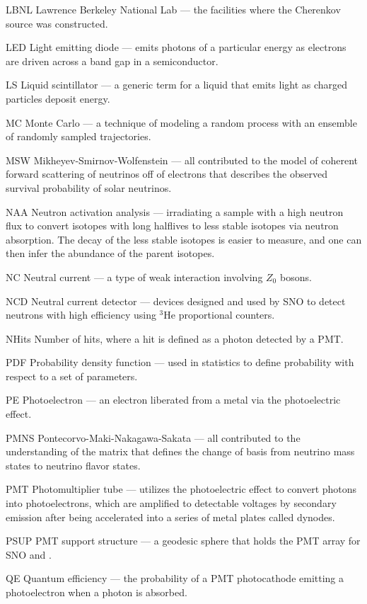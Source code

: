 \begin{labeling}{{\labppo}}
\item[LBNL] Lawrence Berkeley National Lab --- the facilities where the Cherenkov source was constructed.
\item[LED] Light emitting diode --- emits photons of a particular energy as electrons are driven across a band gap in a semiconductor.
\item[LS] Liquid scintillator --- a generic term for a liquid that emits light as charged particles deposit energy.
\item[MC] Monte Carlo --- a technique of modeling a random process with an ensemble of randomly sampled trajectories.
\item[MSW] Mikheyev-Smirnov-Wolfenstein --- all contributed to the model of coherent forward scattering of neutrinos off of electrons that describes the observed survival probability of solar neutrinos.
\item[NAA] Neutron activation analysis --- irradiating a sample with a high neutron flux to convert isotopes with long halflives to less stable isotopes via neutron absorption. The decay of the less stable isotopes is easier to measure, and one can then infer the abundance of the parent isotopes. 
\item[NC] Neutral current --- a type of weak interaction involving $Z_0$ bosons.
\item[NCD] Neutral current detector --- devices designed and used by SNO to detect neutrons with high efficiency using $^3$He proportional counters.
\item[NHits] Number of hits, where a hit is defined as a photon detected by a PMT.
\item[PDF] Probability density function --- used in statistics to define probability with respect to a set of parameters.
\item[PE] Photoelectron --- an electron liberated from a metal via the photoelectric effect.
\item[PMNS] Pontecorvo-Maki-Nakagawa-Sakata --- all contributed to the understanding of the matrix that defines the change of basis from neutrino mass states to neutrino flavor states.
\item[PMT] Photomultiplier tube --- utilizes the photoelectric effect to convert photons into photoelectrons, which are amplified to detectable voltages by secondary emission after being accelerated into a series of metal plates called dynodes.
\item[PSUP] PMT support structure ---  a geodesic sphere that holds the PMT array for SNO and {\snop}.
\item[QE] Quantum efficiency --- the probability of a PMT photocathode emitting a photoelectron when a photon is absorbed.

\end{labeling}
